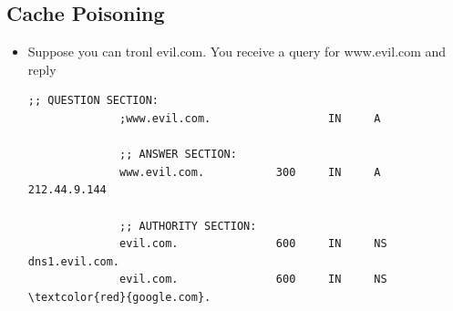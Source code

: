 \subsection{Cache Poisoning}
\begin{itemize}[nosep]
    \item Suppose you can tronl evil.com. You receive a query for www.evil.com and reply
          \begin{Verbatim}[commandchars=\\\{\}]
              ;; QUESTION SECTION:
              ;www.evil.com.                  IN     A

              ;; ANSWER SECTION:
              www.evil.com.           300     IN     A     212.44.9.144

              ;; AUTHORITY SECTION:
              evil.com.               600     IN     NS    dns1.evil.com.
              evil.com.               600     IN     NS    \textcolor{red}{google.com}.


\end{Verbatim}
\end{itemize}
